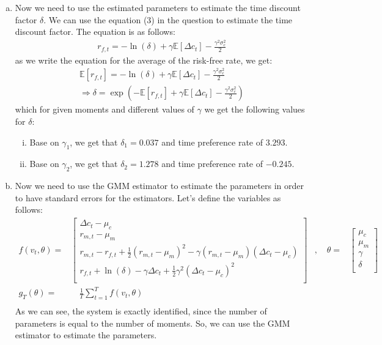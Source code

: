 \begin{enumerate}[(a)]
  \item Now we need to use the estimated parameters to estimate the time discount factor $\delta$. We can use the equation (3) in the question to estimate the time discount factor. The equation is as follows:
  \begin{gather*}
    r_{f,t} = - \ln(\delta) + \gamma\mathbb{E}[\Delta c_t ] - \frac{\gamma^2 \sigma_c^2}{2} 
  \end{gather*}
  as we write the equation for the average of the risk-free rate, we get:
  \begin{gather*}
    \mathbb{E}[r_{f,t}] = - \ln(\delta) + \gamma\mathbb{E}[\Delta c_t ] - \frac{\gamma^2 \sigma_c^2}{2}\\
    \Rightarrow \delta = \exp(- \mathbb{E}[r_{f,t}] + \gamma\mathbb{E}[\Delta c_t ] - \frac{\gamma^2 \sigma_c^2}{2} )
  \end{gather*}
  which for given moments and different values of $\gamma$ we get the following values for $\delta$:
  \begin{enumerate}[i.]
    \item Base on $\gamma_1$, we get that $\delta_1 = 0.037$ and time preference rate of $ 3.293$.
    \item Base on $\gamma_2$, we get that $\delta_2 = 1.278$ and time preference rate of $-0.245$.
  \end{enumerate}


  \item Now we need to use the GMM estimator to estimate the parameters in order to have standard errors for the estimators. Let's define the variables as follows:
  \begin{equation*}
    \begin{aligned}
      f(v_t,\theta) = & \begin{bmatrix}
        \Delta c_t - \mu_c \\
        r_{m,t} - \mu_m \\
        r_{m,t} - r_{f,t} + \frac{1}{2} (r_{m,t} - \mu_m)^2 - \gamma (r_{m,t} - \mu_m)(\Delta c_t - \mu_c) \\
        r_{f,t} + \ln(\delta) -\gamma\Delta c_t +  \frac{1}{2}\gamma^2 (\Delta c_t - \mu_c)^2 \\
      \end{bmatrix} & , \quad 
      \theta = & \begin{bmatrix}
        \mu_c \\
        \mu_m \\
        \gamma \\
        \delta \\
      \end{bmatrix}  \\
      g_T(\theta) = & \quad \frac{1}{T} \sum_{t=1}^T f(v_t,\theta) & \\
    \end{aligned}
    \end{equation*}
    As we can see, the system is exactly identified, since the number of parameters is equal to the number of moments. So, we can use the GMM estimator to estimate the parameters.
    

\end{enumerate}
